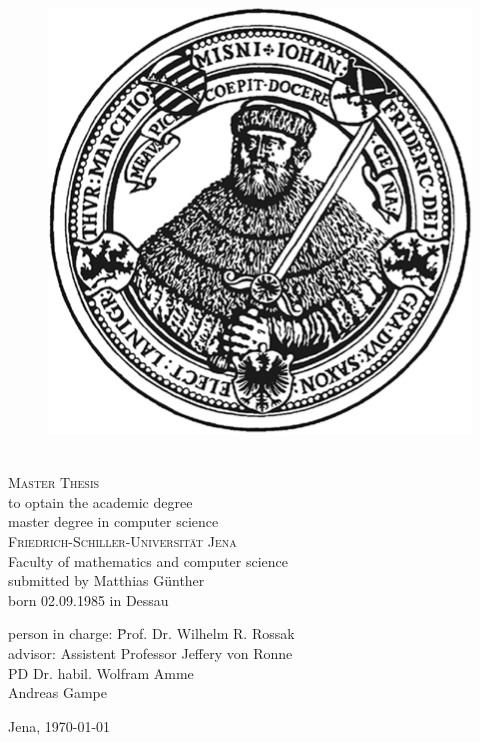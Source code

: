 \begin{titlepage}
 \begin{center}
  \vfill
  \begin{figure}[h]
	\begin{center}
 		\includegraphics[scale=0.6]{../images/hanfried.png}
	\end{center}
  \end{figure}
  \vfill
  \Huge{\theme} \\[0.5em]
  \vfill
  \Large{\textsc{Master Thesis}} \\
  \vfill
  \large{to optain the academic degree \\master degree in computer science} \\
  \vfill
  \Large{\textsc{Friedrich-Schiller-Universität Jena} \\Faculty of mathematics and computer science} \\
  \vfill
  \normalsize{submitted by Matthias Günther\\born 02.09.1985 in Dessau}\\ 
\begin{center}\parbox{0cm}{\begin{tabbing}
person in charge: \= Prof. Dr. Wilhelm R. Rossak \\
advisor: 	\> Assistent Professor Jeffery von Ronne \\
\> PD Dr. habil. Wolfram Amme \\
\> Andreas Gampe \\
\end{tabbing}}\end{center}
  \vfill
  \normalsize{Jena, \today}
 \end{center}
\end{titlepage}

